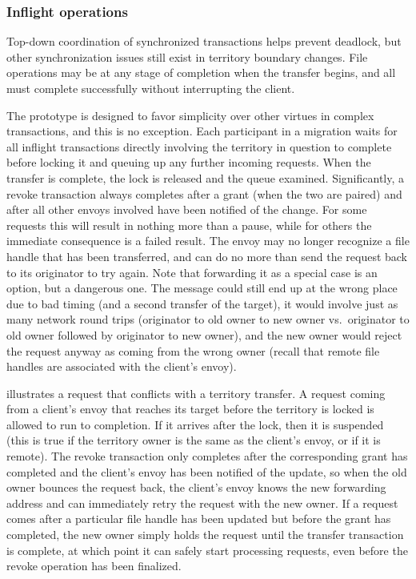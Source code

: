 \subsubsection{Inflight operations}

Top-down coordination of synchronized transactions helps prevent deadlock, but other synchronization issues still exist in territory boundary changes. File operations may be at any stage of completion when the transfer begins, and all must complete successfully without interrupting the client.

The prototype is designed to favor simplicity over other virtues in complex transactions, and this is no exception. Each participant in a migration waits for all inflight transactions directly involving the territory in question to complete before locking it and queuing up any further incoming requests. When the transfer is complete, the lock is released and the queue examined. Significantly, a revoke transaction always completes after a grant (when the two are paired) and after all other envoys involved have been notified of the change. For some requests this will result in nothing more than a pause, while for others the immediate consequence is a failed result. The envoy may no longer recognize a file handle that has been transferred, and can do no more than send the request back to its originator to try again. Note that forwarding it as a special case is an option, but a dangerous one. The message could still end up at the wrong place due to bad timing (and a second transfer of the target), it would involve just as many network round trips (originator to old owner to new owner vs.\ originator to old owner followed by originator to new owner), and the new owner would reject the request anyway as coming from the wrong owner (recall that remote file handles are associated with the client's envoy).

 illustrates a request that conflicts with a territory transfer. A request coming from a client's envoy that reaches its target before the territory is locked is allowed to run to completion. If it arrives after the lock, then it is suspended (this is true if the territory owner is the same as the client's envoy, or if it is remote). The revoke transaction only completes after the corresponding grant has completed and the client's envoy has been notified of the update, so when the old owner bounces the request back, the client's envoy knows the new forwarding address and can immediately retry the request with the new owner. If a request comes after a particular file handle has been updated but before the grant has completed, the new owner simply holds the request until the transfer transaction is complete, at which point it can safely start processing requests, even before the revoke operation has been finalized.

